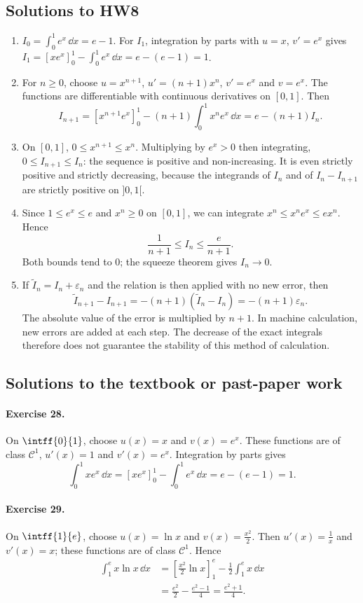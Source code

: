 \subsection{Solutions to HW8}\begin{enumerate}
\item $I_0=\int_0^1e^x\,\dd x=e-1$. For $I_1$, integration by parts with $u=x$, $v'=e^x$ gives $I_1=[xe^x]_0^1-\int_0^1e^x\,\dd x=e-(e-1)=1$.
\item For $n\ge0$, choose $u=x^{n+1}$, $u'=(n+1)x^n$, $v'=e^x$ and $v=e^x$. The functions are differentiable with continuous derivatives on $[0,1]$. Then
\[I_{n+1}=[x^{n+1}e^x]_0^1-(n+1)\int_0^1x^ne^x\,\dd x=e-(n+1)I_n.\]
\item On $[0,1]$, $0\le x^{n+1}\le x^n$. Multiplying by $e^x>0$ then integrating, $0\le I_{n+1}\le I_n$: the sequence is positive and non-increasing. It is even strictly positive and strictly decreasing, because the integrands of $I_n$ and of $I_n-I_{n+1}$ are strictly positive on $]0,1[$.
\item Since $1\le e^x\le e$ and $x^n\ge0$ on $[0,1]$, we can integrate $x^n\le x^ne^x\le ex^n$. Hence
\[\frac1{n+1}\le I_n\le\frac e{n+1}.\]
Both bounds tend to $0$; the squeeze theorem gives $I_n\to0$.
\item If $\widetilde I_n=I_n+\varepsilon_n$ and the relation is then applied with no new error, then
\[\widetilde I_{n+1}-I_{n+1}=-(n+1)(\widetilde I_n-I_n)=-(n+1)\varepsilon_n.\]
The absolute value of the error is multiplied by $n+1$. In machine calculation, new errors are added at each step. The decrease of the exact integrals therefore does not guarantee the stability of this method of calculation.
\end{enumerate}

\subsection{Solutions to the textbook or past-paper work}\paragraph{Exercise 28.} On $\intff{0}{1}$, choose $u(x)=x$ and $v(x)=e^x$. These functions are of class $\mathcal C^1$, $u'(x)=1$ and $v'(x)=e^x$. Integration by parts gives
\[\int_0^1xe^x\,\dd x=[xe^x]_0^1-\int_0^1e^x\,\dd x=e-(e-1)=1.\]
\paragraph{Exercise 29.} On $\intff{1}{e}$, choose $u(x)=\ln x$ and $v(x)=\frac{x^2}2$. Then $u'(x)=\frac1x$ and $v'(x)=x$; these functions are of class $\mathcal C^1$. Hence
\[\begin{aligned}\int_1^e x\ln x\,\dd x&=\left[\frac{x^2}2\ln x\right]_1^e-\frac12\int_1^e x\,\dd x\\&=\frac{e^2}2-\frac{e^2-1}4=\frac{e^2+1}4.\end{aligned}\]

\fi

